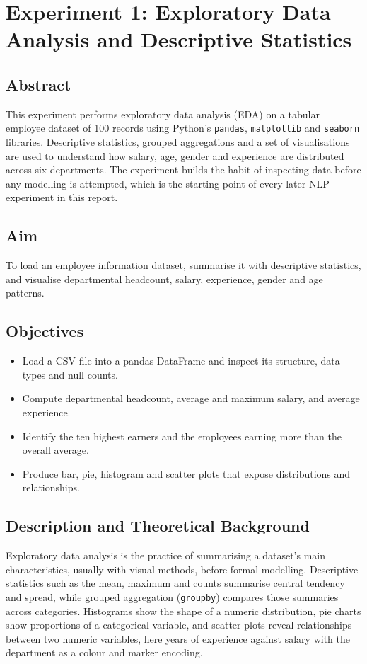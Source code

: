 \documentclass[12pt,a4paper,oneside]{report}
\begin{document}
\chapter{Experiment 1: Exploratory Data Analysis and Descriptive Statistics}
\section{Abstract}
This experiment performs exploratory data analysis (EDA) on a tabular employee dataset of 100 records using Python's \texttt{pandas}, \texttt{matplotlib} and \texttt{seaborn} libraries. Descriptive statistics, grouped aggregations and a set of visualisations are used to understand how salary, age, gender and experience are distributed across six departments. The experiment builds the habit of inspecting data before any modelling is attempted, which is the starting point of every later NLP experiment in this report.


\section{Aim}
To load an employee information dataset, summarise it with descriptive statistics, and visualise departmental headcount, salary, experience, gender and age patterns.


\section{Objectives}
\begin{itemize}
\item Load a CSV file into a pandas DataFrame and inspect its structure, data types and null counts.
\item Compute departmental headcount, average and maximum salary, and average experience.
\item Identify the ten highest earners and the employees earning more than the overall average.
\item Produce bar, pie, histogram and scatter plots that expose distributions and relationships.
\end{itemize}

\section{Description and Theoretical Background}
Exploratory data analysis is the practice of summarising a dataset's main characteristics, usually with visual methods, before formal modelling. Descriptive statistics such as the mean, maximum and counts summarise central tendency and spread, while grouped aggregation (\texttt{groupby}) compares those summaries across categories. Histograms show the shape of a numeric distribution, pie charts show proportions of a categorical variable, and scatter plots reveal relationships between two numeric variables, here years of experience against salary with the department as a colour and marker encoding.
\end{document}
